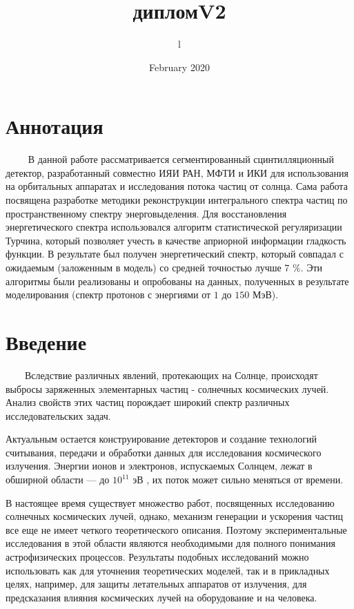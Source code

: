 \documentclass{config}
\title{дипломV2}
\author{l}
\date{February 2020}
\begin{document}
\titlepage
\newpage

\section*{Аннотация}
~~~~
В данной работе рассматривается сегментированный сцинтилляционный детектор, разработанный совместно ИЯИ РАН, МФТИ и ИКИ для использования на орбитальных аппаратах и исследования потока частиц от солнца. Сама работа посвящена разработке методики реконструкции интегрального спектра частиц по пространственному спектру энерговыделения. Для восстановления энергетического спектра использовался алгоритм статистической регуляризации Турчина, который позволяет учесть в качестве априорной информации гладкость функции. В результате был получен энергетический спектр, который совпадал с ожидаемым (заложенным в модель) со средней точностью лучше 7 $\%$. Эти алгоритмы были реализованы и опробованы на данных, полученных в результате моделирования (спектр протонов с энергиями от $1$ до $150$ МэВ).
\newpage

\pagestyle{plain}
\tableofcontents
\newpage

\section{Введение}

~~~~Вследствие различных явлений, протекающих на Солнце, происходят выбросы заряженных элементарных частиц - солнечных космических лучей. Анализ свойств этих частиц порождает широкий спектр различных исследовательских задач.

Актуальным остается конструирование детекторов и создание технологий считывания, передачи и обработки данных для исследования космического излучения. Энергии ионов и электронов, испускаемых Солнцем, лежат в обширной области --- до $10^{11}$ эВ \cite{real_energy_spectrum}, их поток может сильно меняться от времени.

В настоящее время существует множество работ, посвященных исследованию солнечных космических лучей, однако, механизм генерации и ускорения частиц все еще не имеет четкого теоретического описания. Поэтому экспериментальные исследования в этой области являются необходимыми для полного понимания астрофизических процессов. Результаты подобных исследований можно использовать как для уточнения теоретических моделей, так и в прикладных целях, например, для защиты летательных аппаратов от излучения, для предсказания влияния космических лучей на оборудование и на человека.
\end{document}
